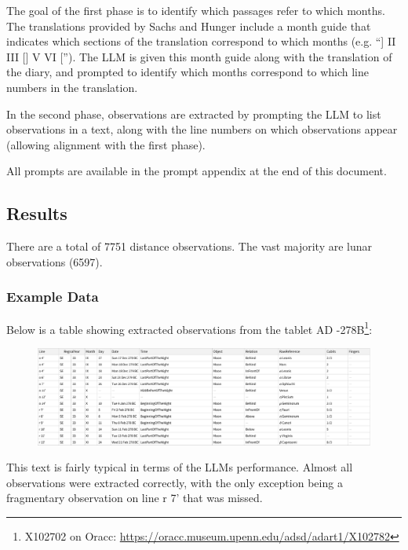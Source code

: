 \documentclass{article}
\begin{document}
The goal of the first phase is to identify which passages refer to which months. The translations provided by Sachs and Hunger include a month guide that indicates which sections of the translation correspond to which months \autocite{sachsHunger} (e.g. ``] II III [] V VI [''). The LLM is given this month guide along with the translation of the diary, and prompted to identify which months correspond to which line numbers in the translation.

In the second phase, observations are extracted by prompting the LLM to list observations in a text, along with the line numbers on which observations appear (allowing alignment with the first phase).

All prompts are available in the prompt appendix at the end of this document.

\subsection{Results}
There are a total of 7751 distance observations. The vast majority are lunar observations (6597).

\subsubsection{Example Data}
Below is a table showing extracted observations from the tablet AD -278B\footnote{X102702 on Oracc: \url{https://oracc.museum.upenn.edu/adsd/adart1/X102782}}:

\begin{figure}[h]
    \includegraphics[width=1\linewidth]{X102782.pdf}
\end{figure}

This text is fairly typical in terms of the LLMs performance. Almost all observations were extracted correctly, with the only exception being a fragmentary observation on line r 7' that was missed.

\end{document}
